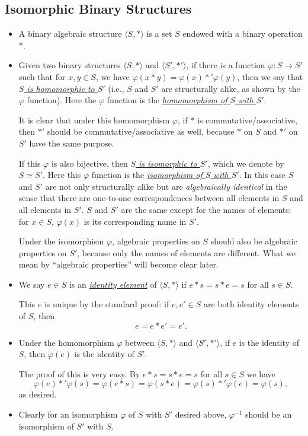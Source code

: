 \documentclass[11pt]{article}
\newcommand{\df}[1]{\ul{\textit{\textsf{#1}}}}
\newcommand{\la}{\langle}
\newcommand{\ra}{\rangle}
\renewcommand{\phi}{\varphi}
\begin{document}
\subsection{Isomorphic Binary Structures}
\begin{itemize}
    \item A binary algebraic structure $\la S,\ast \ra$ is a set $S$ endowed with a binary operation $\ast$.
    \item Given two binary structures $\la S,\ast \ra$ and $\la S',\ast' \ra$, if there is a function $\phi: S \to S'$ such that for $x,y \in S$, we have $\phi(x \ast y) = \phi(x) \ast' \phi(y)$, then we say that \df{$S$ is homomorphic to $S'$} (i.e., $S$ and $S'$ are structurally alike, as shown by the $\phi$ function). Here the $\phi$ function is the \df{homomorphism of $S$ with $S'$}.

    It is clear that under this homomorphism $\phi$, if $\ast$ is commutative/associative, then $\ast'$ should be commutative/associative as well, because $\ast$ on $S$ and $\ast'$ on $S'$ have the same purpose.
    
    If this $\phi$ is also bijective, then \df{$S$ is isomorphic to $S'$}, which we denote by $S \simeq S'$. Here this $\phi$ function is the \df{isomorphism of $S$ with $S'$}. In this case $S$ and $S'$ are not only structurally alike but are \emph{algebraically identical} in the sense that there are one-to-one correspondences between all elements in $S$ and all elements in $S'$. $S$ and $S'$ are the same except for the names of elements: for $x \in S$, $\phi(x)$ is its corresponding name in $S'$.

    Under the isomorphism $\phi$, algebraic properties on $S$ should also be algebraic properties on $S'$, because only the names of elements are different. What we mean by ``algebraic properties'' will become clear later.
    \item We say $e \in S$ is an \df{identity element} of $\la S,\ast \ra$ if $e \ast s = s \ast e = s$ for all $s \in S$.
    
    This $e$ is unique by the standard proof: if $e,e' \in S$ are both identity elements of $S$, then \[e = e \ast e' = e'.\]
    \item Under the homomorphism $\phi$ between $\la S,\ast \ra$ and $\la S',\ast' \ra$, if $e$ is the identity of $S$, then $\phi(e)$ is the identity of $S'$.

    The proof of this is very easy. By $e \ast s = s \ast e = s$ for all $s \in S$ we have \[\phi(e) \ast' \phi(s) = \phi(e \ast s) = \phi (s \ast e) = \phi(s) \ast' \phi(e) = \phi(s),\] as desired.
    \item Clearly for an isomorphism $\phi$ of $S$ with $S'$ desired above, $\phi^{-1}$ should be an isomorphism of $S'$ with $S$.
    

\end{itemize}
\end{document}
